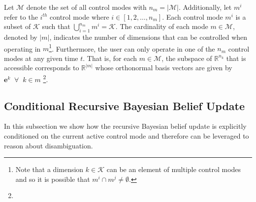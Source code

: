 \documentclass[letterpaper, 10 pt, conference]{ieeeconf}  %
\begin{document}
Let $\mathcal{M}$ denote the set of all control modes with $n_m = \vert\mathcal{M}\vert$. Additionally, let $m^i$ refer to the $i^{th}$ control mode where $i \in [1,2,\dots,n_m]$. Each control mode $m^i$ is a subset of $\mathcal{K}$ such that $\bigcup\limits_{i=1}^{n_m} m^i = \mathcal{K}$. The cardinality of each mode $m \in \mathcal{M}$, denoted by $\vert m \vert$, indicates the number of dimensions that can be controlled when operating in $m$\footnote{Note that a dimension $k \in \mathcal{K}$ can be an element of multiple control modes and so it is possible that $m^i \cap m^j \neq \emptyset$.}. Furthermore, the user can only operate in one of the $n_m$ control modes at any given time $t$. That is, for each $m \in \mathcal{M}$, the subspace of $\mathbb{R}^{n_k}$ that is accessible corresponds to $\mathbb{R}^{\vert m \vert}$ whose orthonormal basis vectors are given by $\boldsymbol{e}^k \;\; \forall \;\; k \in m$  \footnote{}. 
\subsection{Conditional Recursive Bayesian Belief Update}

In this subsection we show how the recursive Bayesian belief update is explicitly conditioned on the current active control mode and therefore can be leveraged to reason about disambiguation.
\end{document}
